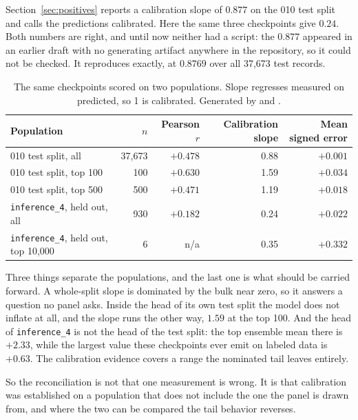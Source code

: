  Section~\ref{sec:positives} reports a calibration slope of $0.877$
on the 010 test split and calls
the predictions calibrated. Here the same three checkpoints give $0.24$. Both
numbers are right, and until now neither had a script: the $0.877$ appeared in an
earlier draft with no generating artifact anywhere in the repository, so it could
not be checked. It reproduces exactly, at $0.8769$ over all 37{,}673 test
records.

\begin{table}[H]
\centering
\footnotesize
\begin{tabular}{lrrrr}
\toprule
Population & $n$ & Pearson $r$ & Calibration slope & Mean signed error \\
\midrule
010 test split, all           & 37{,}673 & $+0.478$ & 0.88 & $+0.001$ \\
010 test split, top 100       &      100 & $+0.630$ & 1.59 & $+0.034$ \\
010 test split, top 500       &      500 & $+0.471$ & 1.19 & $+0.018$ \\
\midrule
\texttt{inference\_4}, held out, all  &  930 & $+0.182$ & 0.24 & $+0.022$ \\
\texttt{inference\_4}, held out, top 10{,}000 & 6 & n/a & 0.35 & $+0.332$ \\
\bottomrule
\end{tabular}
\caption{The same checkpoints scored on two populations. Slope regresses measured
on predicted, so 1 is calibrated. Generated by
\protect{} and
\protect{}.}
\end{table}

Three things separate the populations, and the last one is what should be
carried forward. A whole-split slope is dominated by the bulk near zero, so it
answers a question no panel asks. Inside the head of its own test split the model
does not inflate at all, and the slope runs the other way, $1.59$ at the top 100.
And the head of \texttt{inference\_4} is not the head of the test split: the top
ensemble mean there is $+2.33$, while the largest value these checkpoints ever
emit on labeled data is $+0.63$. The calibration evidence covers a range the
nominated tail leaves entirely.

So the reconciliation is not that one measurement is wrong. It is that
calibration was established on a population that does not include the one the
panel is drawn from, and where the two can be compared the tail behavior
reverses.

